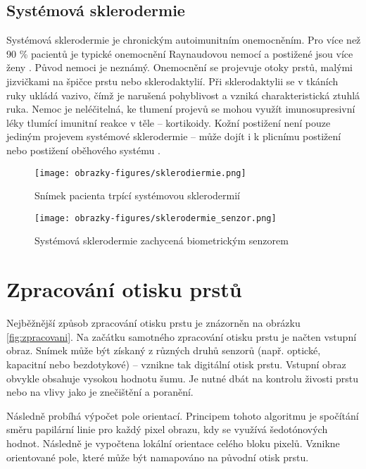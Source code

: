 \subsection*{Systémová sklerodermie}
Systémová sklerodermie je chronickým autoimunitním onemocněním. Pro více než 90 \% pacientů je typické onemocnění Raynaudovou nemocí a postižené jsou více ženy \cite{InfluenceSkinDiseases}. Původ nemoci je neznámý. Onemocnění se projevuje otoky prstů, malými jizvičkami na špičce prstu nebo sklerodaktylií. Při sklerodaktylii se v tkáních ruky ukládá vazivo, čímž je narušená pohyblivost a vzniká charakteristická ztuhlá ruka. Nemoc je neléčitelná, ke tlumení projevů se mohou využít imunosupresivní léky tlumící imunitní reakce v těle -- kortikoidy. Kožní postižení není pouze jediným projevem systémové sklerodermie -- může dojít i k plicnímu postižení nebo postižení oběhového systému \cite{SystemovaSklerodermie}. 

\begin{figure}[!htbp]
  \begin{minipage}[b]{0.5\linewidth}
    \centering
    \texttt{[image: obrazky-figures/sklerodiermie.png]}
    \caption{Snímek pacienta trpící systémovou sklerodermií \cite{InfluenceSkinDiseases}}
  \end{minipage}
  \hspace{0.5cm}
  \begin{minipage}[b]{0.5\linewidth}
    \centering
    \texttt{[image: obrazky-figures/sklerodermie\_senzor.png]}
    \caption{Systémová sklerodermie zachycená biometrickým senzorem \cite{Barotova}}
  \end{minipage}
\end{figure}

\section{Zpracování otisku prstů}
Nejběžnější způsob zpracování otisku prstu je znázorněn na obrázku \ref{fig:zpracovani}. Na začátku samotného zpracování otisku prstu je načten vstupní obraz. Snímek může být získaný z různých druhů senzorů (např. optické, kapacitní nebo bezdotykové) -- vznikne tak digitální otisk prstu. Vstupní obraz obvykle obsahuje vysokou hodnotu šumu. Je nutné dbát na kontrolu živosti prstu nebo na vlivy jako je znečištění a poranění.

Následně probíhá výpočet pole orientací. Principem tohoto algoritmu je spočítání směru papilární linie pro každý pixel obrazu, kdy se využívá šedotónových hodnot. Následně je vypočtena lokální orientace celého bloku pixelů. Vznikne orientované pole, které může být namapováno na původní otisk prstu.

